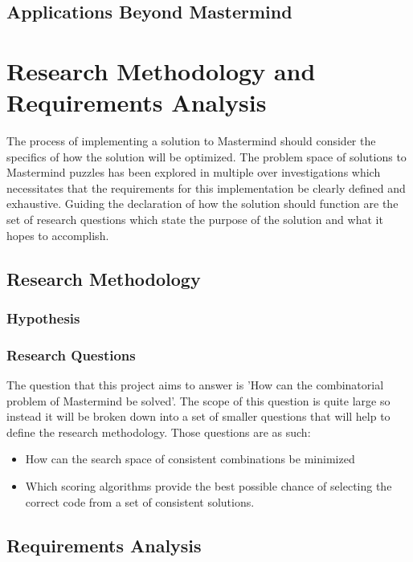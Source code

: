 \documentclass[12pt]{article}  %
\theoremstyle{definition}
\theoremstyle{remark}
\begin{document}
\subsection {Applications Beyond Mastermind}

\newpage                     %
\section{Research Methodology and Requirements Analysis}\label{ss:back}

The process of implementing a solution to Mastermind should consider the specifics of how the solution will be optimized. The problem space of solutions to Mastermind puzzles has been explored in multiple over investigations which necessitates that the requirements for this implementation be clearly defined and exhaustive. Guiding the declaration of how the solution should function are the set of research questions which state the purpose of the solution and what it hopes to accomplish.

\subsection {Research Methodology}

\subsubsection{Hypothesis}

\subsubsection {Research Questions}

The question that this project aims to answer is 'How can the combinatorial problem of Mastermind be solved'. The scope of this question is quite large so instead it will be broken down into a set of smaller questions that will help to define the research methodology. Those questions are as such:

\begin {itemize}
	\item {How can the search space of consistent combinations be minimized}
	\item {Which scoring algorithms provide the best possible chance of selecting the correct code from a set of consistent solutions.}
\end {itemize}

\subsection {Requirements Analysis}
\end{document}
